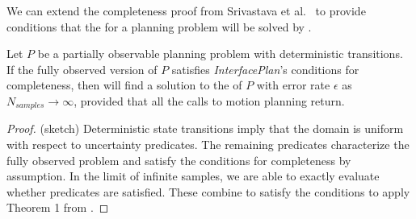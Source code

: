We can extend the completeness proof from Srivastava et
al.~\cite{srivastava2014combined} to provide conditions that the
\mld{} for a planning problem will be solved by \ibsp{}.
\begin{thm}
Let $P$ be a partially observable planning problem with deterministic
transitions. If the fully observed version of $P$ satisfies \emph{InterfacePlan}'s
conditions for completeness, then 
will find a solution to the \mld{} of $P$ with error
rate $\epsilon$ as $N_{samples}\rightarrow \infty$, provided that all
the calls to motion planning return.
\end{thm}
\begin{proof} (sketch) 
Deterministic state transitions imply that the domain is uniform with
respect to uncertainty predicates. The remaining predicates
characterize the fully observed problem and satisfy the conditions for
completeness by assumption. In the limit of infinite samples, we are able to
exactly evaluate whether predicates are satisfied. These combine to satisfy
the conditions to apply Theorem 1 from \cite{srivastava2014combined}.
\end{proof}
